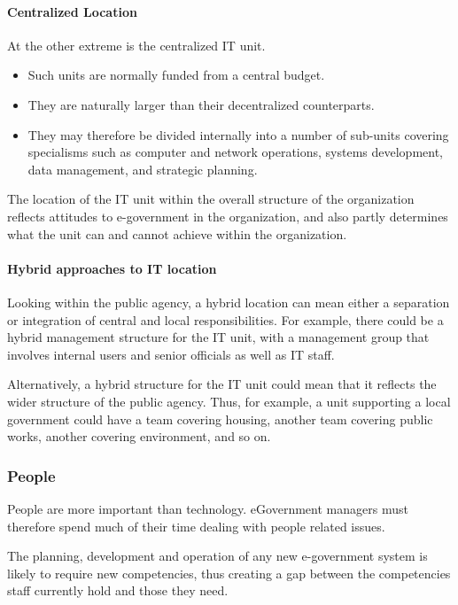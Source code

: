 \paragraph*{Centralized Location}
At the other extreme is the centralized IT unit. 

\begin{itemize}
	\item Such units are normally funded from a	central budget. 
	\item They are naturally larger than their decentralized counterparts. 
	\item They may therefore be divided internally into a number of sub-units covering specialisms such as computer and network operations, systems development, data management, and strategic planning.
\end{itemize}

The location of the IT unit within the
overall structure of the organization reflects
attitudes to e-government in the organization, and also partly determines what the
unit can and cannot achieve within the
organization.


\paragraph*{Hybrid approaches to IT location}
Looking within the public agency, a hybrid location can mean either a separation or
integration of central and local responsibilities. For example, there could be a hybrid
management structure for the IT unit, with a management group that involves internal
users and senior officials as well as IT staff.

Alternatively, a hybrid structure for the IT unit could mean that it reflects the wider
structure of the public agency. Thus, for example, a unit supporting a local government could have a team covering housing, another team covering public works, another covering environment, and so on.


\subsubsection{People}
People are more important than technology. eGovernment managers must therefore spend much of their time dealing with people related issues.

The planning, development and operation of any new e-government system is likely to require new competencies, thus creating a gap between the competencies staff currently hold and those they need.

